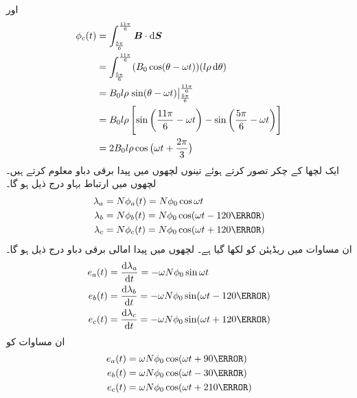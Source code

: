 اور
\begin{gather}
\begin{aligned}
\phi_c(t)&=\int_{\frac{5\pi}{6}}^{\frac{11\pi}{6}} \kvec{B} \cdot \dif \kvec{S}\\
&=\int_{\frac{5\pi}{6}}^{\frac{11\pi}{6}} (B_0 \cos (\theta-\omega t))(l \rho \dif \theta)\\
&=B_0 l \rho \left. \sin (\theta-\omega t) \right\vert_{\frac{5\pi}{6}}^{\frac{11\pi}{6}}\\
&=B_0 l \rho \left[\sin \left(\frac{11\pi}{6}-\omega t \right )-\sin \left (\frac{5\pi}{6}-\omega t \right) \right]\\
&=2 B_0 l \rho \cos \big(\omega t+\frac{2\pi}{3}\big)
\end{aligned}
\end{gather}
ایک لچھا کے  چکر تصور کرتے ہوئے تینوں لچھوں میں پیدا برقی دباو معلوم کرتے ہیں۔لچھوں میں ارتباط بہاو درج ذیل ہو گا۔
\begin{gather}
\begin{aligned}
\lambda_a&=N \phi_a (t)=N \phi_0 \cos \omega t\\
\lambda_b&=N \phi_b (t)=N \phi_0 \cos (\omega t-120\degree)\\
\lambda_c&=N \phi_c (t)=N \phi_0 \cos (\omega t+120\degree)
\end{aligned}
\end{gather}
ان مساوات میں  ریڈیئن کو  لکھا گیا ہے۔ لچھوں میں پیدا امالی برقی دباو درج ذیل ہو گا۔
\begin{gather}
\begin{aligned}\label{مساوات_گھومتے_مشین_تین_دور_سائن_نما_برقی_دباو_الف}
e_a(t)&=\frac{\dif \lambda_a}{\dif t}=-\omega N \phi_0 \sin \omega t\\
e_b(t)&=\frac{\dif \lambda_b}{\dif t}=-\omega N \phi_0 \sin (\omega t-120\degree)\\
e_c(t)&=\frac{\dif \lambda_c}{\dif t}=-\omega N \phi_0 \sin (\omega t+120\degree)
\end{aligned}
\end{gather}
ان مساوات کو 
\begin{gather}
\begin{aligned}\label{مساوات_گھومتے_مشین_تین_دور_سائن_نما_برقی_دباو}
e_a(t)&=\omega N \phi_0 \cos (\omega t +90\degree)\\
e_b(t)&=\omega N \phi_0 \cos (\omega t-30\degree)\\
e_c(t)&=\omega N \phi_0 \cos (\omega t+210\degree)
\end{aligned}
\end{gather}
